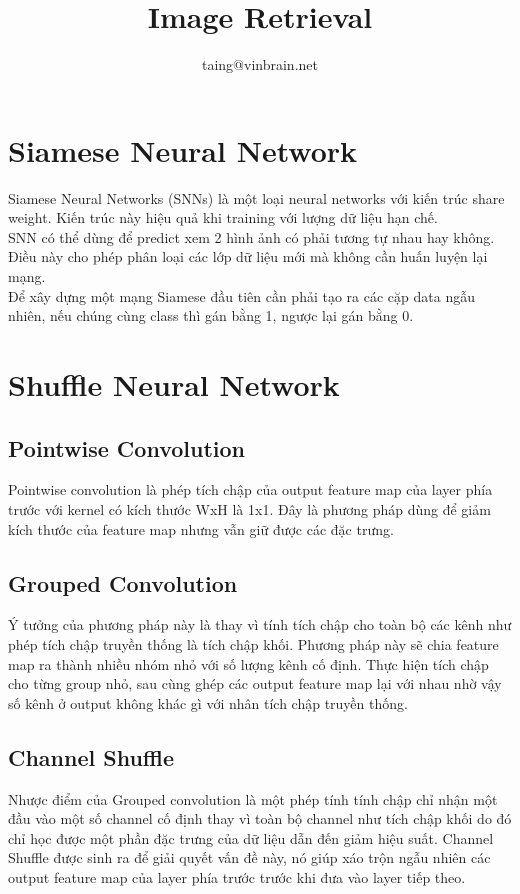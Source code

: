 \documentclass[11pt,a4paper]{article}
\title{Image Retrieval}
\author{taing@vinbrain.net}
\begin{document}
	\maketitle
	\section{Siamese Neural Network}
	Siamese Neural Networks (SNNs) là một loại neural networks với kiến trúc share weight. Kiến trúc này hiệu quả khi training với lượng dữ liệu hạn chế.\\
	SNN có thể dùng để predict xem 2 hình ảnh có phải tương tự nhau hay không. Điều này cho phép phân loại các lớp dữ liệu mới mà không cần huấn luyện lại mạng.\\
	Để xây dựng một mạng Siamese đầu tiên cần phải tạo ra các cặp data ngẫu nhiên, nếu chúng cùng class thì gán bằng 1, ngược lại gán bằng 0.
	\section{Shuffle Neural Network}
	\subsection{Pointwise Convolution}
	Pointwise convolution là phép tích chập của output feature map của layer phía trước với kernel có kích thước WxH là 1x1. Đây là phương pháp dùng để giảm kích thước của feature map nhưng vẫn giữ được các đặc trưng.
	\subsection{Grouped Convolution}
	Ý tưởng của phương pháp này là thay vì tính tích chập cho toàn bộ các kênh như phép tích chập truyền thống là tích chập khối. Phương pháp này sẽ chia feature map ra thành nhiều nhóm nhỏ với số lượng kênh cố định. Thực hiện tích chập cho từng group nhỏ, sau cùng ghép các output feature map lại với nhau nhờ vậy số kênh ở output không khác gì với nhân tích chập truyền thống.
	\subsection{Channel Shuffle}
	Nhược điểm của Grouped convolution là một phép tính tính chập chỉ nhận một đầu vào một số channel cố định thay vì toàn bộ channel như tích chập khối do đó chỉ học được một phần đặc trưng của dữ liệu dẫn đến giảm hiệu suất. Channel Shuffle được sinh ra để giải quyết vấn đề này, nó giúp xáo trộn ngẫu nhiên các output feature map của layer phía trước trước khi đưa vào layer tiếp theo.
\end{document}
